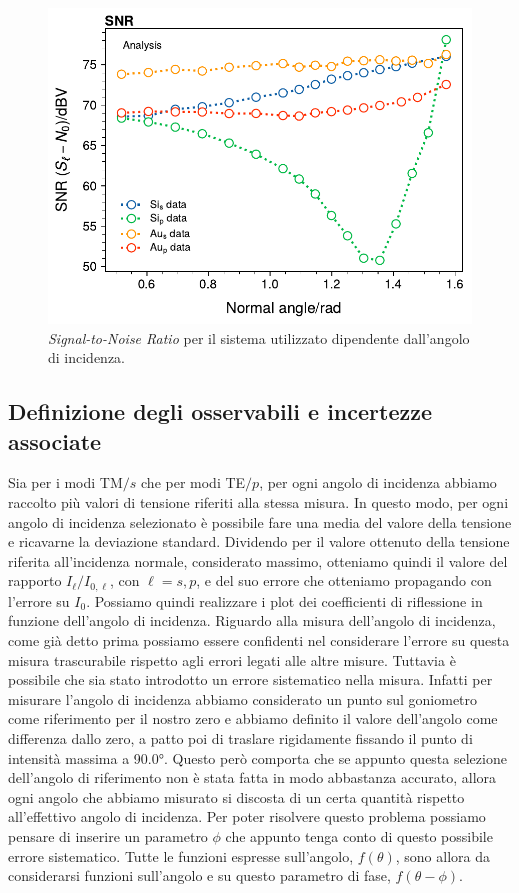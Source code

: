 \documentclass[
    prb,altaffilletter,citeautoscript,
    amsmath,amssymb,
    showpacs,showkeys,floatfix,
    reprint
]{revtex4-1}
\begin{document}
\begin{figure}
    \centering
    \includegraphics[width=\linewidth]{figures/SNR.pdf}
    \caption{\emph{Signal-to-Noise Ratio} per il sistema utilizzato dipendente dall'angolo di incidenza.}
    \label{fig:SNR}
\end{figure}

\subsection{Definizione degli osservabili e incertezze associate}

Sia per i modi TM$/s$ che per modi TE$/p$, per ogni angolo di incidenza abbiamo raccolto più valori di tensione riferiti alla stessa misura. In questo modo, per ogni angolo di incidenza selezionato è possibile fare una media del valore della tensione e ricavarne la deviazione standard. Dividendo per il valore ottenuto della tensione riferita all'incidenza normale, considerato massimo, otteniamo quindi il valore del rapporto $I_\ell/I_{0,\ell}$, con $\ell=s,p$, e del suo errore che otteniamo propagando con l'errore su $I_0$. Possiamo quindi realizzare i plot dei coefficienti di riflessione in funzione dell'angolo di incidenza. Riguardo alla misura dell'angolo di incidenza, come già detto prima possiamo essere confidenti nel considerare l'errore su questa misura trascurabile rispetto agli errori legati alle altre misure. Tuttavia è possibile che sia stato introdotto un errore sistematico nella misura. Infatti per misurare l'angolo di incidenza abbiamo considerato un punto sul goniometro come riferimento per il nostro zero e abbiamo definito il valore dell'angolo come differenza dallo zero, a patto poi di traslare rigidamente fissando il punto di intensità massima a \ang{90.0}. Questo però comporta che se appunto questa selezione dell'angolo di riferimento non è stata fatta in modo abbastanza accurato, allora ogni angolo che abbiamo misurato si discosta di un certa quantità rispetto all'effettivo angolo di incidenza. Per poter risolvere questo problema possiamo pensare di inserire un  parametro $\phi$ che appunto tenga conto di questo possibile errore sistematico. Tutte le funzioni espresse sull'angolo, $f(\theta)$, sono allora da considerarsi funzioni sull'angolo e su questo parametro di fase, $f(\theta-\phi)$.
\end{document}
